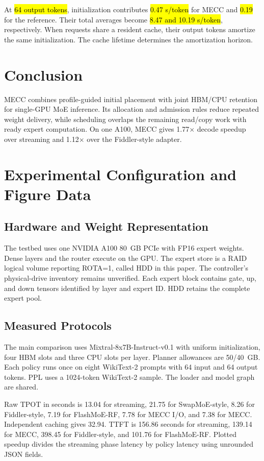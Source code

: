 \documentclass[conference,9pt,letterpaper]{IEEEtran}
\DeclareRobustCommand{\pending}[1]{{\sethlcolor{yellow}\hl{#1}}}
\begin{document}
At \pending{64 output tokens}, initialization contributes \pending{0.47 s/token} for MECC and \pending{0.19} for the reference. Their total averages become \pending{8.47 and 10.19 s/token}, respectively. When requests share a resident cache, their output tokens amortize the same initialization. The cache lifetime determines the amortization horizon.

\section{Conclusion}
MECC combines profile-guided initial placement with joint HBM/CPU retention for single-GPU MoE inference. Its allocation and admission rules reduce repeated weight delivery, while scheduling overlaps the remaining read/copy work with ready expert computation. On one A100, MECC gives 1.77$\times$ decode speedup over streaming and 1.12$\times$ over the Fiddler-style adapter.

\clearpage
\balance


\clearpage
\appendices
\balance
\section{Experimental Configuration and Figure Data}
\label{app:setup}
\subsection{Hardware and Weight Representation}
The testbed uses one NVIDIA A100 80~GB PCIe with FP16 expert weights. Dense layers and the router execute on the GPU. The expert store is a RAID logical volume reporting ROTA=1, called HDD in this paper. The controller's physical-drive inventory remains unverified. Each expert block contains gate, up, and down tensors identified by layer and expert ID. HDD retains the complete expert pool.

\subsection{Measured Protocols}
The main comparison uses Mixtral-8x7B-Instruct-v0.1 with uniform initialization, four HBM slots and three CPU slots per layer. Planner allowances are 50/40~GB. Each policy runs once on eight WikiText-2 prompts with 64 input and 64 output tokens. PPL uses a 1024-token WikiText-2 sample. The loader and model graph are shared.

Raw TPOT in seconds is 13.04 for streaming, 21.75 for SwapMoE-style, 8.26 for Fiddler-style, 7.19 for FlashMoE-RF, 7.78 for MECC I/O, and 7.38 for MECC. Independent caching gives 32.94. TTFT is 156.86 seconds for streaming, 139.14 for MECC, 398.45 for Fiddler-style, and 101.76 for FlashMoE-RF. Plotted speedup divides the streaming phase latency by policy latency using unrounded JSON fields.
\end{document}
